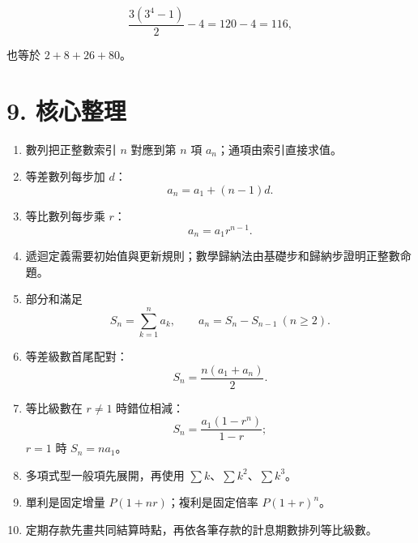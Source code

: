 \documentclass[11pt,a4paper]{article}
\providecommand{\tightlist}{%
  \setlength{\itemsep}{0pt}\setlength{\parskip}{0pt}}
\begin{document}
\[
\frac{3(3^4-1)}2-4=120-4=116,
\]

也等於 \(2+8+26+80\)。

\section{9. 核心整理}\label{ux6838ux5fc3ux6574ux7406}

\begin{enumerate}
\def\labelenumi{\arabic{enumi}.}
\tightlist
\item
  數列把正整數索引 \(n\) 對應到第 \(n\) 項 \(a_n\)；通項由索引直接求值。
\item
  等差數列每步加 \(d\)：
  \[a_n=a_1+(n-1)d.\]
\item
  等比數列每步乘 \(r\)：
  \[a_n=a_1r^{n-1}.\]
\item
  遞迴定義需要初始值與更新規則；數學歸納法由基礎步和歸納步證明正整數命題。
\item
  部分和滿足
  \[S_n=\sum_{k=1}^{n}a_k,\qquad a_n=S_n-S_{n-1}\ (n\ge2).\]
\item
  等差級數首尾配對：
  \[S_n=\frac{n(a_1+a_n)}2.\]
\item
  等比級數在 \(r\ne1\) 時錯位相減：
  \[S_n=\frac{a_1(1-r^n)}{1-r};\]
  \(r=1\) 時 \(S_n=na_1\)。
\item
  多項式型一般項先展開，再使用 \(\sum k\)、\(\sum k^2\)、\(\sum k^3\)。
\item
  單利是固定增量 \(P(1+nr)\)；複利是固定倍率 \(P(1+r)^n\)。
\item
  定期存款先畫共同結算時點，再依各筆存款的計息期數排列等比級數。
\end{enumerate}
\end{document}
